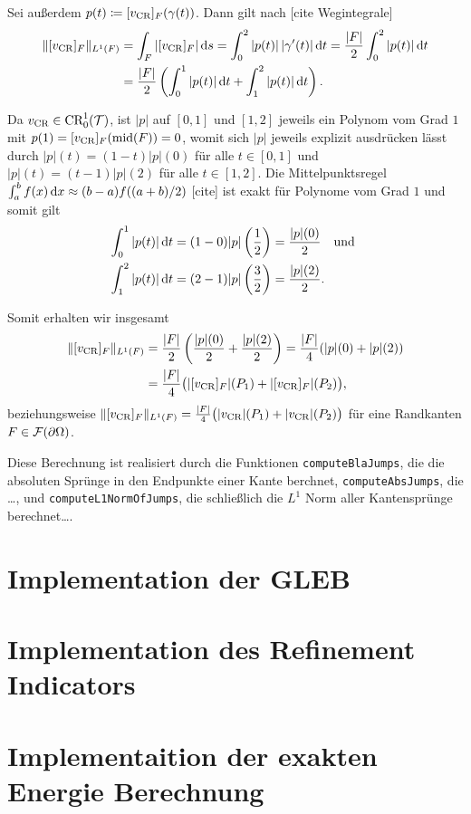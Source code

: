 Sei außerdem
$p(t)\coloneqq [v_\textup{CR}]_F(\gamma(t))$. Dann gilt nach
 [cite Wegintegrale] 
\begin{align*}
  \Vert [v_\textup{CR}]_F\Vert_{L^1(F)} 
  &=
  \int_F |[v_\textup{CR}]_F|\,\mathrm{d}s 
  = \int_0^2 |p(t)|\,|\gamma'(t)|\,\mathrm{d}t
  = \frac{|F|}{2}\int_0^2 |p(t)|\,\mathrm{d}t\\
  &= \frac{|F|}{2}\left(\int_0^1 |p(t)|\,\mathrm{d}t + \int_1^2 |p(t)|\,\mathrm{d}t\right).
\end{align*}

Da $v_\textup{CR}\in\textup{CR}^1_0(\mathcal{T})$, ist $|p|$ auf $[0,1]$ und $[1,2]$ jeweils
ein Polynom
vom Grad $1$ mit $p(1)=[v_\textup{CR}]_F(\textup{mid}(F))=0$, womit sich $|p|$ jeweils
explizit ausdrücken lässt durch
$|p|(t)=(1-t)|p|(0)$ für alle $t\in[0,1]$ und 
$|p|(t)=(t-1)|p|(2)$ für alle $t\in[1,2]$.
Die Mittelpunktsregel $\int_a^b f(x)\,\mathrm{d}x\approx (b-a)f( (a+b)/2)$ [cite] ist
exakt für Polynome vom Grad $1$ und somit gilt
\begin{align*}
  \int_0^1 |p(t)|\,\mathrm{d}t 
  &= 
  (1-0)|p|\left( \frac{1}{2} \right)
  =
  \frac{|p|(0)}{2}\quad\text{und }\\
  \int_1^2 |p(t)|\,\mathrm{d}t 
  &= 
  (2-1)|p|\left( \frac{3}{2} \right)
  =
  \frac{|p|(2)}{2}.
\end{align*}

Somit erhalten wir insgesamt 
\begin{align*}
  \Vert [v_\textup{CR}]_F\Vert_{L^1(F)} 
  &=
  \frac{|F|}{2}\left(\frac{|p|(0)}{2} + \frac{|p|(2)}{2}\right)
  =
  \frac{|F|}{4}(|p|(0)+|p|(2))\\
  &= 
  \frac{|F|}{4}\big(|[v_\textup{CR}]_F|(P_1)+|[v_\textup{CR}]_F|(P_2)\big),
\end{align*}
beziehungsweise 
  $\Vert [v_\textup{CR}]_F\Vert_{L^1(F)} =
  \frac{|F|}{4}\big(|v_\textup{CR}|(P_1)+|v_\textup{CR}|(P_2)\big)$ für eine Randkanten
  $F\in\mathcal{F}(\partial\Omega)$.

Diese Berechnung ist realisiert durch die 
Funktionen \texttt{computeBlaJumps}, die die absoluten Sprünge
in den Endpunkte einer Kante berchnet, \texttt{computeAbsJumps}, die \ldots,
und \texttt{computeL1NormOfJumps}, die schließlich die $L^1$ Norm aller
Kantensprünge berechnet\ldots.



\section{Implementation der GLEB}

\section{Implementation des Refinement Indicators}

\section{Implementaition der exakten Energie Berechnung}
